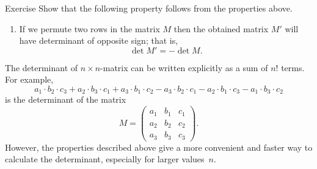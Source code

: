 \begin{thm}{Exercise}
Show that the following property follows from the properties above.
\end{thm}

\begin{enumerate}[resume]
 \item If we permute two rows in the matrix $M$ then the obtained matrix $M'$ will have determinant of opposite sign; that is,
\[\det M'=-\det M.\]
\end{enumerate}

The determinant of $n\times n$-matrix can be written explicitly as a sum of $n!$ terms. 
For example, 
\[
a_1{\cdot} b_2{\cdot} c_3+a_2{\cdot} b_3{\cdot} c_1+a_3{\cdot} b_1{\cdot} c_2-a_3{\cdot} b_2{\cdot} c_1-a_2{\cdot} b_1{\cdot} c_3-a_1{\cdot} b_3{\cdot} c_2\]
is the determinant of the matrix
\[M=\left(
\begin{matrix}
a_1&b_1&c_1
\\
a_2&b_2&c_2
\\
a_3&b_3&c_3
\end{matrix}
\right).\]
However, the properties described above give a more convenient and faster way to calculate the determinant, especially for larger values~$n$.


